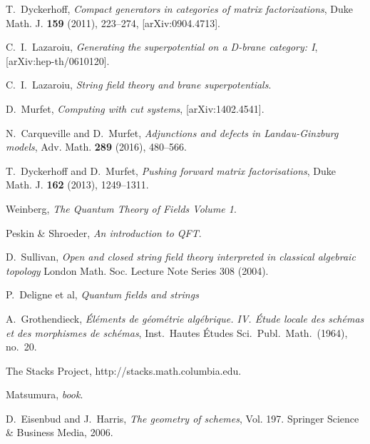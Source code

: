 \documentclass[english,letter paper,12pt,leqno]{article}
\theoremstyle{example}
\numberwithin{equation}{section}
\begin{document}
\newpage


\providecommand{\bysame}{\leavevmode\hbox to3em{\hrulefill}\thinspace}
\providecommand{\href}[2]{#2}
\begin{thebibliography}{BHLS03}
  
T.~Dyckerhoff, \textsl{Compact generators in categories of matrix factorizations},
  Duke Math. J. \textbf{159} (2011), 223--274,
  \href{http://arxiv.org/abs/0904.4713}{[arXiv:0904.4713]}.
  
C.~I.~Lazaroiu, \textsl{Generating the superpotential on a D-brane category: I}, [arXiv:hep-th/0610120].

C.~I.~Lazaroiu, \textsl{String field theory and brane superpotentials}.
  
D.~Murfet, \textsl{Computing with cut systems}, \href{http://arxiv.org/abs/1402.4541}{[arXiv:1402.4541]}.

N.~Carqueville and D.~Murfet, \textsl{Adjunctions and defects in Landau-Ginzburg models}, Adv. Math. \textbf{289} (2016), 480--566.

T.~Dyckerhoff and D.~Murfet, \textsl{Pushing forward matrix factorisations}, Duke Math. J. \textbf{162} (2013), 1249--1311.

Weinberg, \textsl{The Quantum Theory of Fields Volume 1}.

Peskin \& Shroeder, \textsl{An introduction to QFT}.

D.~Sullivan, \textsl{Open and closed string field theory interpreted in classical algebraic topology} London Math. Soc. Lecture Note Series 308 (2004).

P.~Deligne et al, \textsl{Quantum fields and strings}

A.~Grothendieck, \textsl{\'{E}l\'ements de g\'eom\'etrie alg\'ebrique. {IV}. \'{E}tude
  locale des sch\'emas et des morphismes de sch\'emas}, Inst.~Hautes \'Etudes
  Sci.~Publ.~Math.~(1964), no.~20.

The Stacks Project, \href{http://stacks.math.columbia.edu/}{http://stacks.math.columbia.edu}.

Matsumura, \emph{book}.

D.~Eisenbud and J.~Harris, \textsl{The geometry of schemes}, Vol. 197. Springer Science \& Business Media, 2006.


\end{thebibliography}
\end{document}
